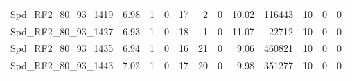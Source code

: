 \begin{longtable}[c]{@{}lrrrrrrrrrrr@{}}
Spd\_RF2\_80\_93\_1419       & 6.98                   & 1                       & 0                       & 17                     & 2                       & 0                       & 10.02                   & 116443                   & 10                       & 0                        & 0                        \\
Spd\_RF2\_80\_93\_1427       & 6.93                   & 1                       & 0                       & 18                     & 1                       & 0                       & 11.07                   & 22712                    & 10                       & 0                        & 0                        \\
Spd\_RF2\_80\_93\_1435       & 6.94                   & 1                       & 0                       & 16                     & 21                      & 0                       & 9.06                    & 460821                   & 10                       & 0                        & 0                        \\
Spd\_RF2\_80\_93\_1443       & 7.02                   & 1                       & 0                       & 17                     & 20                      & 0                       & 9.98                    & 351277                   & 10                       & 0                        & 0                        \\* \bottomrule
\end{longtable}